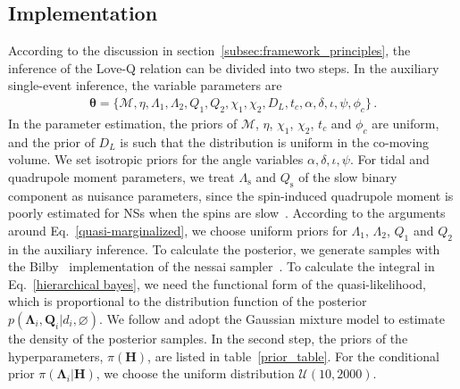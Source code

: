 \documentclass[a4paper,11pt]{article}
\begin{document}
\subsection{Implementation}
\label{subsec:simulation_implementation}

According to the discussion in section~\ref{subsec:framework_principles}, the
inference of the Love-Q relation can be divided into two steps.  In the
auxiliary single-event inference, the variable parameters are 
\begin{align}
	\bm{\theta} = \{\mathcal{M},\eta, \Lambda_1,\Lambda_2,
	Q_1,Q_2,\chi_1,\chi_2, D_L,t_{c},\alpha, \delta,\iota,\psi,\phi_{c}\} \,.
\end{align}
In the parameter estimation, the priors of $\mathcal{M}$, $\eta$, $\chi_1$,
$\chi_2$, $t_{c}$ and $\phi_{c}$ are uniform, and the prior of $D_L$ is such
that the distribution is uniform in the co-moving volume. We set isotropic
priors for the angle variables $\alpha,\delta,\iota,\psi$. For tidal and
quadrupole moment parameters, we treat $\Lambda_{\mathrm{s}}$ and
$Q_{\mathrm{s}}$ of the slow binary component as nuisance parameters, since the
spin-induced quadrupole moment is poorly estimated for NSs when the spins are
slow~\cite{Yagi:2013awa}.  According to the arguments around
Eq.~\eqref{quasi-marginalized}, we choose uniform priors for $\Lambda_1$,
$\Lambda_2$, $Q_1$ and $Q_2$ in the auxiliary inference.  To calculate the
posterior, we generate samples with the {\sc Bilby}~\cite{Ashton:2018jfp}
implementation of the {\sc nessai} sampler~\cite{Skilling:2004pqw,
Skilling:2006gxv, michael_j_williams_2025_14627250, PhysRevD.103.103006,
Williams:2023ppp}.  To calculate the integral in Eq.~\eqref{hierarchical bayes},
we need the functional form of the quasi-likelihood, which is proportional to
the distribution function of the posterior $p(\bm{\Lambda}_i,
\bm{Q}_i|d_i,\varnothing)$. We follow \citet{Golomb:2021tll} and adopt the
Gaussian mixture model to estimate the density of the posterior samples.  In the
second step, the priors of the hyperparameters, $\pi(\bm{H})$, are listed in
table~\ref{prior_table}. For the conditional prior $\pi(\bm
{\Lambda}_i|\bm{H})$, we choose the uniform distribution $\mathcal{U}(10,2000)$.
\end{document}
